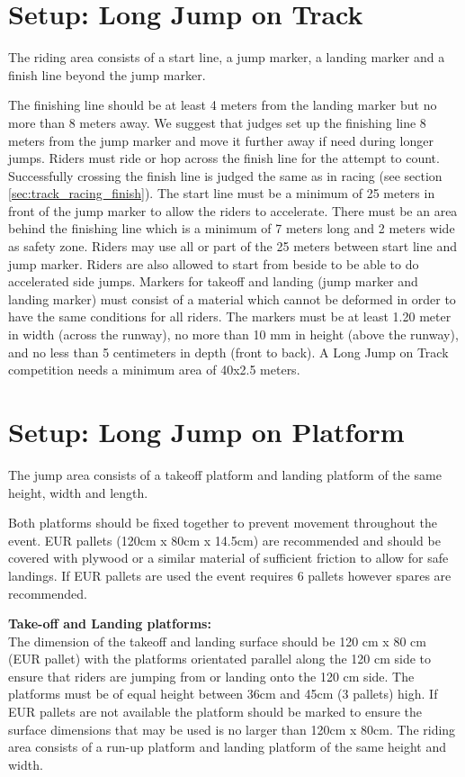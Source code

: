 \section{Setup: Long Jump on Track}
The riding area consists of a start line, a jump marker, a landing marker and a finish line beyond the jump marker.

The finishing line should be at least 4 meters from the landing marker but no more than 8 meters away.
We suggest that judges set up the finishing line 8 meters from the jump marker and move it further away if need during longer jumps.
Riders must ride or hop across the finish line for the attempt to count.
Successfully crossing the finish line is judged the same as in racing (see section \ref{sec:track_racing_finish}).
The start line must be a minimum of 25 meters in front of the jump marker to allow the riders to accelerate.
There must be an area behind the finishing line which is a minimum of 7 meters long and 2 meters wide as safety zone.
Riders may use all or part of the 25 meters between start line and jump marker.
Riders are also allowed to start from beside to be able to do accelerated side jumps.
Markers for takeoff and landing (jump marker and landing marker) must consist of a material which cannot be deformed in order to have the same conditions for all riders.
The markers must be at least 1.20 meter in width (across the runway), no more than 10 mm in height (above the runway), and no less than 5 centimeters in depth (front to back).
A Long Jump on Track competition needs a minimum area of 40x2.5 meters.

\section{Setup: Long Jump on Platform}
The jump area consists of a takeoff platform and landing platform of the same height, width and length.

Both platforms should be fixed together to prevent movement throughout the event.
EUR pallets (120cm x 80cm x 14.5cm) are recommended and should be covered with plywood or a similar material of sufficient friction to allow for safe landings.
If EUR pallets are used the event requires 6 pallets however spares are recommended.

\textbf{Take-off and Landing platforms:}\\
The dimension of the takeoff and landing surface should be 120 cm x 80 cm (EUR pallet) with the platforms orientated parallel along the 120 cm side to ensure that riders are jumping from or landing onto the 120 cm side.
The platforms must be of equal height between 36cm and 45cm (3 pallets) high.
If EUR pallets are not available the platform should be marked to ensure the surface dimensions that may be used is no larger than 120cm x 80cm.
The riding area consists of a run-up platform and landing platform of the same height and width.

